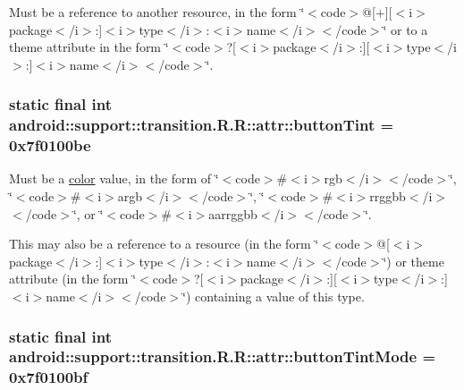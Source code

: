 Must be a reference to another resource, in the form \char`\"{}$<$code$>$@\mbox{[}+\mbox{]}\mbox{[}$<$i$>$package$<$/i$>$:\mbox{]}$<$i$>$type$<$/i$>$:$<$i$>$name$<$/i$>$$<$/code$>$\char`\"{} or to a theme attribute in the form \char`\"{}$<$code$>$?\mbox{[}$<$i$>$package$<$/i$>$:\mbox{]}\mbox{[}$<$i$>$type$<$/i$>$:\mbox{]}$<$i$>$name$<$/i$>$$<$/code$>$\char`\"{}. \hypertarget{classandroid_1_1support_1_1transition_1_1_r_1_1attr_be9b82695c0eeec235fefe4206e581f1}{
\subsubsection[{buttonTint}]{\setlength{\rightskip}{0pt plus 5cm}static final int android::support::transition.R.R::attr::buttonTint = 0x7f0100be}}
\label{classandroid_1_1support_1_1transition_1_1_r_1_1attr_be9b82695c0eeec235fefe4206e581f1}


Must be a \hyperlink{classandroid_1_1support_1_1transition_1_1_r_1_1color}{color} value, in the form of \char`\"{}$<$code$>$\#$<$i$>$rgb$<$/i$>$$<$/code$>$\char`\"{}, \char`\"{}$<$code$>$\#$<$i$>$argb$<$/i$>$$<$/code$>$\char`\"{}, \char`\"{}$<$code$>$\#$<$i$>$rrggbb$<$/i$>$$<$/code$>$\char`\"{}, or \char`\"{}$<$code$>$\#$<$i$>$aarrggbb$<$/i$>$$<$/code$>$\char`\"{}. 

This may also be a reference to a resource (in the form \char`\"{}$<$code$>$@\mbox{[}$<$i$>$package$<$/i$>$:\mbox{]}$<$i$>$type$<$/i$>$:$<$i$>$name$<$/i$>$$<$/code$>$\char`\"{}) or theme attribute (in the form \char`\"{}$<$code$>$?\mbox{[}$<$i$>$package$<$/i$>$:\mbox{]}\mbox{[}$<$i$>$type$<$/i$>$:\mbox{]}$<$i$>$name$<$/i$>$$<$/code$>$\char`\"{}) containing a value of this type. \hypertarget{classandroid_1_1support_1_1transition_1_1_r_1_1attr_ca14bed9ece5be64514bc43eabd0939f}{
\subsubsection[{buttonTintMode}]{\setlength{\rightskip}{0pt plus 5cm}static final int android::support::transition.R.R::attr::buttonTintMode = 0x7f0100bf}}
\label{classandroid_1_1support_1_1transition_1_1_r_1_1attr_ca14bed9ece5be64514bc43eabd0939f}


